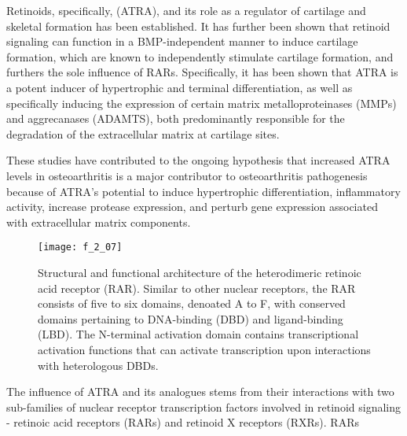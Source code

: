 \begin{refsection}
Retinoids, specifically,  (ATRA), and its role
as a regulator of cartilage and skeletal formation has been
established.\cite{Koyama1999} It has further been shown that retinoid signaling
can function in a BMP-independent manner to induce cartilage formation, which
are known to independently stimulate cartilage formation, and furthers the sole
influence of RARs.\cite{Weston2000} Specifically, it has been shown that ATRA is
a potent inducer of hypertrophic and terminal differentiation, as well as
specifically inducing the expression of certain matrix metalloproteinases (MMPs)
and aggrecanases (ADAMTS), both predominantly responsible for the degradation of
the extracellular matrix at cartilage
sites.\cite{Wang2002,Iwamoto1994,Koyama1999,Johnson2003}

These studies have contributed to the ongoing hypothesis that increased ATRA
levels in osteoarthritis is a major contributor to osteoarthritis pathogenesis
because of ATRA's potential to induce hypertrophic differentiation, inflammatory
activity, increase protease expression, and perturb gene expression associated
with extracellular matrix components. 
\begin{figure}[h!] \centering \texttt{[image: f\_2\_07]}
    \caption[Structural and functional architecture of the heterodimeric
        retinoic acid receptor (RAR). Similar to other nuclear receptors, the
        RAR consists of five to six domains, denoated A to F, with conserved
        domains pertaining to DNA-binding (DBD) and ligand-binding (LBD).  The
        N-terminal activation domain contains transcriptional activation
        functions that can activate transcription upon interactions with
        heterologous DBDs.]
        {Structural and functional architecture of the heterodimeric
        retinoic acid receptor (RAR). Similar to other nuclear receptors, the
        RAR consists of five to six domains, denoated A to F, with conserved
        domains pertaining to DNA-binding (DBD) and ligand-binding (LBD).  The
        N-terminal activation domain contains transcriptional activation
        functions that can activate transcription upon interactions with
        heterologous
        DBDs.\cite{DeLera2007}}\label{fig:retinoid_receptor_structures}
    \end{figure}
The influence of ATRA and its analogues stems from their interactions with two
sub-families of nuclear receptor transcription factors involved in retinoid
signaling - retinoic acid receptors (RARs) and retinoid X receptors (RXRs). RARs

\end{refsection}
